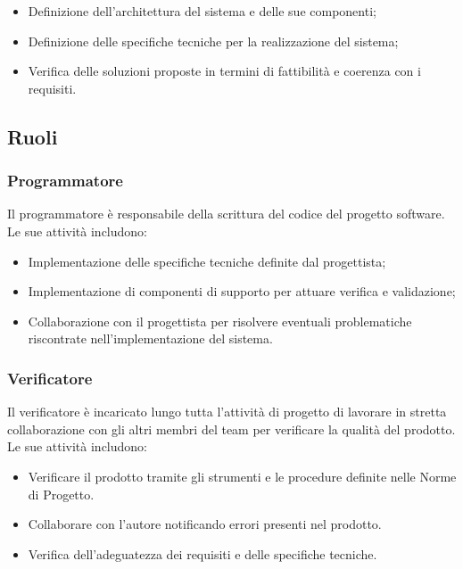 \begin{itemize}
\item Definizione dell'architettura del sistema e delle sue componenti;
\item Definizione delle specifiche tecniche per la realizzazione del sistema;
\item Verifica delle soluzioni proposte in termini di fattibilità e coerenza con i requisiti.
\end{itemize}

\subsection{Ruoli}

\subsubsection{Programmatore}

Il programmatore è responsabile della scrittura del codice del progetto software. Le sue attività includono:

\begin{itemize}
\item Implementazione delle specifiche tecniche definite dal progettista;
\item Implementazione di componenti di supporto per attuare verifica e validazione;
\item Collaborazione con il progettista per risolvere eventuali problematiche riscontrate nell'implementazione del sistema.
\end{itemize}

\subsubsection{Verificatore}

Il verificatore è incaricato lungo tutta l'attività di progetto di lavorare in stretta collaborazione con gli altri membri del team per verificare la qualità del prodotto. Le sue attività includono:

\begin{itemize}
\item Verificare il prodotto tramite gli strumenti e le procedure definite nelle Norme di Progetto.
\item Collaborare con l'autore notificando errori presenti nel prodotto.
\item Verifica dell'adeguatezza dei requisiti e delle specifiche tecniche.
\end{itemize}

